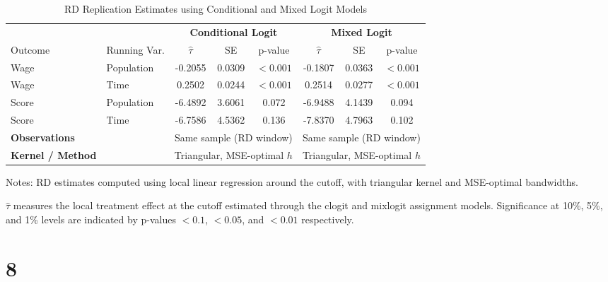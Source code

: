 \documentclass{article}
\begin{document}
\begin{table}[H]
\centering
\caption{RD Replication Estimates using Conditional and Mixed Logit Models}
\label{tab:rd_replication}
\begin{threeparttable}
\begin{tabular}{llcccccc}
\toprule
 & & \multicolumn{3}{c}{\textbf{Conditional Logit}} & \multicolumn{3}{c}{\textbf{Mixed Logit}} \\
\cmidrule(lr){3-5} \cmidrule(lr){6-8}
Outcome & Running Var. & $\hat{\tau}$ & SE & p-value & $\hat{\tau}$ & SE & p-value \\
\midrule
Wage  & Population & -0.2055 & 0.0309 & $<0.001$ & -0.1807 & 0.0363 & $<0.001$ \\
Wage  & Time       &  0.2502 & 0.0244 & $<0.001$ &  0.2514 & 0.0277 & $<0.001$ \\
Score & Population & -6.4892 & 3.6061 & 0.072 & -6.9488 & 4.1439 & 0.094 \\
Score & Time       & -6.7586 & 4.5362 & 0.136 & -7.8370 & 4.7963 & 0.102 \\
\midrule
\textbf{Observations} &  & \multicolumn{3}{c}{Same sample (RD window)} & \multicolumn{3}{c}{Same sample (RD window)} \\
\textbf{Kernel / Method} &  & \multicolumn{3}{c}{Triangular, MSE-optimal $h$} & \multicolumn{3}{c}{Triangular, MSE-optimal $h$} \\
\bottomrule
\end{tabular}
\begin{tablenotes}
\footnotesize
\item Notes: RD estimates computed using local linear regression around the cutoff, with triangular kernel and MSE-optimal bandwidths.
\item $\hat{\tau}$ measures the local treatment effect at the cutoff estimated through the clogit and mixlogit assignment models.
Significance at 10\%, 5\%, and 1\% levels are indicated by p-values $<0.1$, $<0.05$, and $<0.01$ respectively.
\end{tablenotes}
\end{threeparttable}
\end{table}



\section{8}
\end{document}
